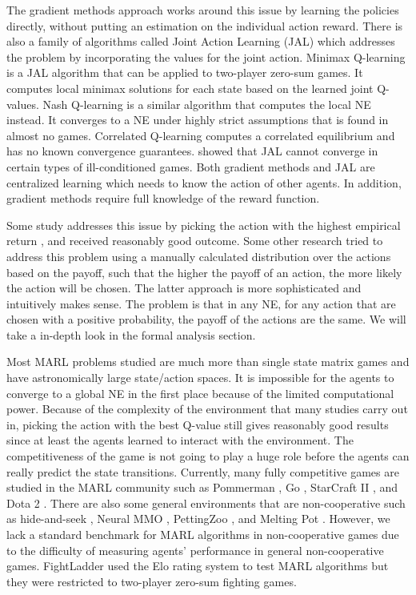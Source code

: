 \documentclass[a4paper]{article}
\begin{document}
\begin{multicols}{2}
The gradient methods approach works around this issue by learning the policies directly, without putting an estimation on the individual action reward. There is also a family of algorithms called Joint Action Learning (JAL) which addresses the problem by incorporating the values for the joint action. Minimax Q-learning \cite{littman1994markov} is a JAL algorithm that can be applied to two-player zero-sum games. It computes local minimax solutions for each state based on the learned joint Q-values. Nash Q-learning \cite{hu2003nash} is a similar algorithm that computes the local NE instead. It converges to a NE under highly strict assumptions that is found in almost no games. Correlated Q-learning \cite{greenwald2003correlated} computes a correlated equilibrium and has no known convergence guarantees. \cite{zinkevich2005cyclic} showed that JAL cannot converge in certain types of ill-conditioned games. Both gradient methods and JAL are centralized learning which needs to know the action of other agents. In addition, gradient methods require full knowledge of the reward function.

Some study addresses this issue by picking the action with the highest empirical return \cite{bjornsson2009cadiaplayer}, and received reasonably good outcome. Some other research \cite{qu2020distributed} tried to address this problem using a manually calculated distribution over the actions based on the payoff, such that the higher the payoff of an action, the more likely the action will be chosen. The latter approach is more sophisticated and intuitively makes sense. The problem is that in any NE, for any action that are chosen with a positive probability, the payoff of the actions are the same. We will take a in-depth look in the formal analysis section.

Most MARL problems studied are much more than single state matrix games and have astronomically large state/action spaces. It is impossible for the agents to converge to a global NE in the first place because of the limited computational power. Because of the complexity of the environment that many studies carry out in, picking the action with the best Q-value still gives reasonably good results since at least the agents learned to interact with the environment. The competitiveness of the game is not going to play a huge role before the agents can really predict the state transitions. Currently, many fully competitive games are studied in the MARL community such as Pommerman \cite{resnick2018pommerman}, Go \cite{silver2017mastering}, StarCraft II \cite{vinyals2019grandmaster}, and Dota 2 \cite{berner2019dota}. There are also some general environments that are non-cooperative such as hide-and-seek \cite{baker2019emergent}, Neural MMO \cite{suarez2021neural}, PettingZoo \cite{terry2021pettingzoo}, and Melting Pot \cite{leibo2021scalable}. However, we lack a standard benchmark for MARL algorithms in non-cooperative games due to the difficulty of measuring agents' performance in general non-cooperative games.
FightLadder \cite{li2024fightladder} used the Elo rating system to test MARL algorithms but they were restricted to two-player zero-sum fighting games.


\end{multicols}
\end{document}
